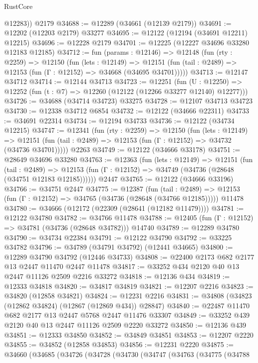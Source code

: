 \begin{lexlean}{RustCore}
\begin{coremodule}
        @12283))
    @2179
@34688 := @12289 (@34661 (@12139 @2179))
@34691 := @12202 (@12203 @2179) @33277
@34695 := @12122 (@12194 (@34691 @12211) @12215)
@34696 := @12228 @2179
@34701 := @12225 (@12227 @34696 @33280 @12183 @12185)
@34712 := fun (params : @12146) =>
  @12148
    (fun (rty : @2259) =>
    @12150
      (fun (lets : @12149) =>
      @12151 (fun (tail : @2489) => @12153 (fun (Γ : @12152) => @34668 (@34695 @34701)))))
@34713 := @12147 @34712
@34714 := @12144 @34713
@34723 := @12251
    (fun (U : @12250) => @12252 (fun (t : @7) => @12260 (@12122 (@12266 @33277 @12140) @12277)))
@34726 := @34688 (@34714 @34723) @33275
@34728 := @12107 @34713 @34723
@34730 := @12338 @34712 @6854
@34732 := @12122 (@34666 @22311)
@34733 := @34691 @22314
@34734 := @12194 @34733
@34736 := @12122 (@34734 @12215)
@34747 := @12341
    (fun (rty : @2259) =>
    @12150
      (fun (lets : @12149) =>
      @12151 (fun (tail : @2489) => @12153 (fun (Γ : @12152) => @34732 (@34736 @34701)))))
    @2263
@34749 := @12122 (@34666 @33178)
@34751 := @28649 @34696 @33280
@34763 := @12363
    (fun (lets : @12149) =>
    @12151
      (fun (tail : @2489) =>
      @12153 (fun (Γ : @12152) => @34749 (@34736 (@28648 (@34751 @12183 @12185))))))
    @2447
@34765 := @12122 (@34666 @33196)
@34766 := @34751 @2447
@34775 := @12387
    (fun (tail : @2489) => @12153 (fun (Γ : @12152) => @34765 (@34736 (@28648 (@34766 @12185)))))
    @11478
@34780 := @34666 (@12172 (@22309 (@28641 (@12182 @11479))))
@34781 := @12122 @34780
@34782 := @34766 @11478
@34788 := @12405 (fun (Γ : @12152) => @34781 (@34736 (@28648 @34782))) @14740
@34789 := @12289 @34780
@34790 := @34734 @22384
@34791 := @12122 @34790
@34792 := @33225 @34782
@34796 := @34789 (@34791 @34792) (@12441 @34665)
@34800 := @12289 @34790 @34792 (@12446 @34733)
@34808 := @22400 @2173 @682 @2177 @13 @2447 @11470 @2447 @11478
@34817 := @33252 @434 @2120 @40 @13 @2447 @11126 @2509 @2216 @33272
@34818 := @12136 @434
@34819 := @12333 @34818
@34820 := @34817 @34819
@34821 := @12207 @2216
@34823 := @34820 (@12858 @34821)
@34824 := @12231 @2216
@34831 := @34808 (@34823 (@12862 @34824) (@12867 (@12869 @434)) @28847)
@34840 := @22487 @11470 @682 @2177 @13 @2447 @5768 @2447 @11476 @33307
@34849 := @33252 @439 @2120 @40 @13 @2447 @11126 @2509 @2220 @33272
@34850 := @12136 @439
@34851 := @12333 @34850
@34852 := @34849 @34851
@34853 := @12207 @2220
@34855 := @34852 (@12858 @34853)
@34856 := @12231 @2220
@34875 := @34660
    (@34685
      (@34726
        (@34728
          (@34730
            (@34747
              (@34763
                (@34775
                  (@34788

\end{coremodule}
\end{lexlean}
